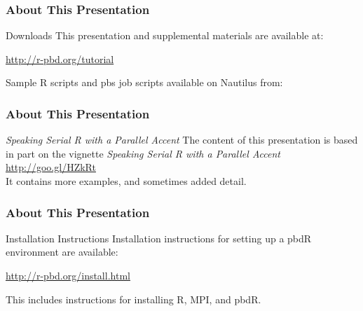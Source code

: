 \begin{frame}
\frametitle{About This Presentation}
 \begin{block}{Downloads}
  This presentation and supplemental materials are available at:
  \begin{center}
  \url{http://r-pbd.org/tutorial}
  \end{center}
  Sample R scripts and pbs job scripts available on Nautilus from:\\
  \centering{}
 \end{block}
\end{frame}


\begin{frame}
\frametitle{About This Presentation}
 \begin{block}{\emph{Speaking Serial R with a Parallel Accent}}
  The content of this presentation is based in part on the  
vignette \emph{Speaking Serial R with a Parallel Accent}\\[.4cm]
  \url{http://goo.gl/HZkRt}\\[.4cm]
  It contains more examples, and sometimes added detail.
 \end{block}
\end{frame}


\begin{frame}
\frametitle{About This Presentation}
 \begin{block}{Installation Instructions}
  Installation instructions for setting up a pbdR environment are available:
  \begin{center}
  \url{http://r-pbd.org/install.html}
  \end{center}
  This includes instructions for installing R, MPI, and pbdR.
 \end{block}
\end{frame}






